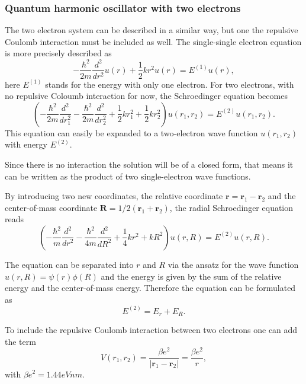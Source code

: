 \documentclass[%
reprint,
amsmath,amssymb,
aps,
]{revtex4-1}
\begin{document}
\subsubsection{Quantum harmonic oscillator with two electrons} \noindent 
The two electron system can be described in a similar way, but one the repulsive Coulomb interaction must be included as well. The single-single electron equation is more precisely described as
\begin{equation*}
    -\frac{\hbar^2}{2m}\frac{d^2}{dr^2}u(r)+\frac{1}{2}kr^2u(r) = E^{(1)}u(r),
\end{equation*}
here $E^{(1)}$ stands for the energy with only one electron. For two electrons, with no repulsive Coloumb interaction for now, the Schroedinger equation becomes
\begin{equation*}
    \left(-\frac{\hbar^2}{2m}\frac{d^2}{dr^2_1}-\frac{\hbar^2}{2m}\frac{d^2}{dr^2_2}+\frac{1}{2}kr^2_1+\frac{1}{2}kr^2_2\right)u(r_1,r_2) = E^{(2)}u(r_1,r_2).
\end{equation*}
This equation can easily be expanded to a two-electron wave function $u(r_1,r_2)$ with energy $E^{(2)}$.\par
Since there is no interaction the solution will be of a closed form, that means it can be written as the product of two single-electron wave functions.\par
By introducing two new coordinates, the relative coordinate $\bm{r}=\bm{r}_1-\bm{r}_2$ and the center-of-mass coordinate $\bm{R}=1/2(\bm{r}_1+\bm{r}_2)$, the radial Schroedinger equation reads
\begin{equation*}
    \left(-\frac{\hbar^2}{m}\frac{d^2}{dr^2}-\frac{\hbar^2}{4m}\frac{d^2}{dR^2}+\frac{1}{4}kr^2+kR^2\right)u(r,R) = E^{(2)}u(r,R).
\end{equation*}
\par The equation can be separated into $r$ and $R$ via the ansatz for the wave function $u(r,R)=\psi(r)\phi(R)$ and the energy is given by the sum of the relative energy and the center-of-mass energy. Therefore the equation can be formulated as
\begin{equation*}
    E^{(2)} = E_r+E_R.
\end{equation*}
\par To include the repulsive Coulomb interaction between two electrons one can add the term
\begin{equation*}
    V(r_1,r_2) = \frac{\beta e^2}{|\bm{r}_1-\bm{r}_2|} = \frac{\beta e^2}{r},
\end{equation*}
with $\beta e^2=1.44 eVnm$.
\end{document}
